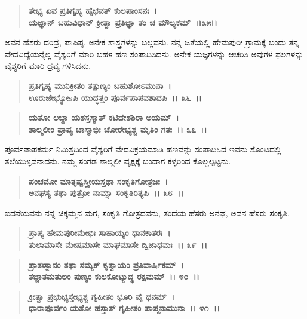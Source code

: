 \begin{verse}
\textbf{ತೇಭ್ಯ ಏವ ಪ್ರತಿಗೃಹ್ಯ ಹೈಭವತ್ ಕುಲಪಾಂಸನಃ~।}\\\textbf{ಯಜ್ಞಾನ್ ಬಹುವಿಧಾನ್ ಕ್ರೀತ್ವಾ ಪ್ರತಿಜ್ಞಾ ತಂ ಚ ಮೌಲ್ಯಕಮ್~।।೩೫।।}
\end{verse}

ಅವನ ಹೆಸರು ದರಿದ್ರ, ಪಾಪಿಷ್ಠ, ಅನೇಕ ಶಾಸ್ತ್ರಗಳನ್ನು ಬಲ್ಲವನು. ನನ್ನ ಜತೆಯಲ್ಲಿ ಹೇಮಪುರೀ ಗ್ರಾಮಕ್ಕೆ ಬಂದು ತನ್ನ ವೇದವಿದ್ಯೆಯನ್ನೆಲ್ಲ ವೈಶ್ಯರಿಗೆ ಮಾರಿ ಬಹಳ ಹಣ ಸಂಪಾದಿಸಿದನು. ಅನೇಕ ಯಜ್ಞಗಳನ್ನು ಆಚರಿಸಿ ಅವುಗಳ ಫಲಗಳನ್ನು ವೈಶ್ಯರಿಗೆ ಮಾರಿ ದ್ರವ್ಯ ಗಳಿಸಿದನು.

\begin{verse}
\textbf{ಪ್ರತಿಗೃಹ್ಯ ಮುನಿಕ್ರೀತಂ ತತ್ಪುಣ್ಯಂ ಬಹುಶೋಽಮುನಾ~।}\\\textbf{ಊರುಜೇಭ್ಯೋsಪಿ ಯುದ್ಧತ್ತಂ ಪೂರ್ವಪಾಪವಶಾದಪಿ~।। ೩೬~।।}
\end{verse}

\begin{verse}
\textbf{ಯತೋ ಲಬ್ಧಾ ಯಶಸ್ತಸ್ಮಾತ್ ಕಟಿದೇಶಶಿರಾ ಅಯಮ್~।}\\\textbf{ಶಾಲ್ಮಲೀಂ ಪ್ರಾಪ್ಯ ಚಾಸ್ಮಾಭಿಃ ಚೋರೇಭ್ಯಶ್ಚ ಮೃತಿಂ ಗತಃ~।। ೩೭~।।}
\end{verse}

ಪೂರ್ವಪಾಪಕರ್ಮ ನಿಮಿತ್ತದಿಂದ ವೈಶ್ಯರಿಗೆ ವೇದವಿಕ್ರಯಮಾಡಿ ಹಣವನ್ನು ಸಂಪಾದಿಸಿದ ಇವನು ಸೊಂಟದಲ್ಲಿ ತಲೆಯುಳ್ಳವನಾದನು. ನಮ್ಮ ಸಂಗಡ ಶಾಲ್ಮಲೀ ವೃಕ್ಷಕ್ಕೆ ಬಂದಾಗ ಕಳ್ಳರಿಂದ ಕೊಲ್ಲಲ್ಪಟ್ಟನು.

\begin{verse}
\textbf{ಪಂಚಮೋ ಮಾತೃಷ್ವಸ್ತ್ರೀಯಸ್ತಥಾ ಸಂಕೃತಿಗೋತ್ರಜಃ~।}\\\textbf{ಅನಘಸ್ಯ ತಥಾ ಪುತ್ರೋ ನಾಮ್ನಾ ಸಂಕೃತಿರಿತ್ಯಪಿ~।। ೩೮~।।}
\end{verse}

ಐದನೆಯವನು ನನ್ನ ಚಿಕ್ಕಮ್ಮನ ಮಗ, ಸಂಕೃತಿ ಗೋತ್ರದವನು, ತಂದೆಯ ಹೆಸರು ಅನಘ, ಅವನ ಹೆಸರು ಸಂಕೃತಿ.

\begin{verse}
\textbf{ಪ್ರಾಪ್ಯ ಹೇಮಪುರೀಮೇಭಿಃ ಸಾಹಾಯ್ಯಂ ಧಾನಕಾತರಃ~।}\\\textbf{ತುಲಾಮಾಸೇ ಮೇಷಮಾಸೇ ಮಾಘಮಾಸೇ ದ್ವಿಜಾಧಮಃ~।। ೩೯~।। }
\end{verse}

\begin{verse}
\textbf{ಪ್ರಾತಃಸ್ನಾನಂ ತಥಾ ಸಮ್ಯಕ್ ಕೃತ್ವಾಯಂ ಪ್ರತಿವಾರ್ಷಿಕಮ್~।}\\\textbf{ತಜ್ಜಾತಮತುಲಂ ಪುಣ್ಯಂ ಕುಲಕೋಟ್ಯುದ್ಧ ರಕ್ಷಮಮ್~।। ೪೦~।। }
\end{verse}

\begin{verse}
\textbf{ಕ್ರೀತ್ವಾ ಪ್ರಭುಭ್ಯಸ್ತೇಭ್ಯಶ್ಚ ಗೃಹೀತಂ ಭೂರಿ ವೈ ಧನಮ್~।}\\\textbf{ಧಾರಾಪೂರ್ವಂ ಯತೋ ಹಸ್ತಾತ್ ಗೃಹೀತಂ ಪಾಪ್ಮನಾಮುನಾ~।। ೪೧~।।}
\end{verse}

